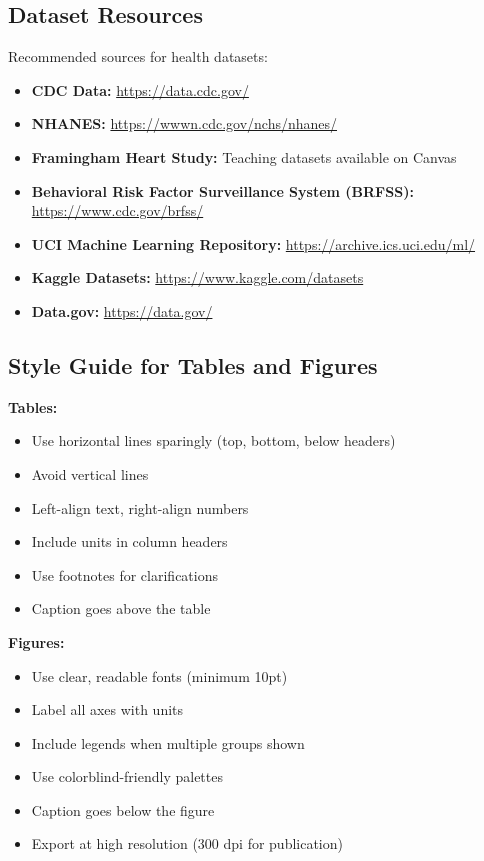 \documentclass[11pt]{article}
\begin{document}
\subsection{Dataset Resources}

Recommended sources for health datasets:
\begin{itemize}
\item \textbf{CDC Data:} \url{https://data.cdc.gov/}
\item \textbf{NHANES:} \url{https://wwwn.cdc.gov/nchs/nhanes/}
\item \textbf{Framingham Heart Study:} Teaching datasets available on Canvas
\item \textbf{Behavioral Risk Factor Surveillance System (BRFSS):} \url{https://www.cdc.gov/brfss/}
\item \textbf{UCI Machine Learning Repository:} \url{https://archive.ics.uci.edu/ml/}
\item \textbf{Kaggle Datasets:} \url{https://www.kaggle.com/datasets}
\item \textbf{Data.gov:} \url{https://data.gov/}
\end{itemize}

\subsection{Style Guide for Tables and Figures}

\textbf{Tables:}
\begin{itemize}
\item Use horizontal lines sparingly (top, bottom, below headers)
\item Avoid vertical lines
\item Left-align text, right-align numbers
\item Include units in column headers
\item Use footnotes for clarifications
\item Caption goes above the table
\end{itemize}

\textbf{Figures:}
\begin{itemize}
\item Use clear, readable fonts (minimum 10pt)
\item Label all axes with units
\item Include legends when multiple groups shown
\item Use colorblind-friendly palettes
\item Caption goes below the figure
\item Export at high resolution (300 dpi for publication)
\end{itemize}
\end{document}
